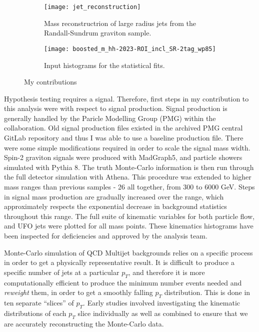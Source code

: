 \documentclass[12pt]{article}
\begin{document}
\begin{figure}[t]
    \centering
    \begin{subfigure}[t]{.48\textwidth}
        \centering
        \texttt{[image: jet\_reconstruction]}
        \caption{Mass reconstructrion of large radius jets from the Randall-Sundrum graviton sample.}
        \label{subfig:jet_reconstruction}
    \end{subfigure}
    \hfill
    \begin{subfigure}[t]{.48\textwidth}
        \centering
        \texttt{[image: boosted\_m\_hh-2023-ROI\_incl\_SR-2tag\_wp85]}
        \caption{Input histograms for the statistical fits.}
        \label{subfig:input_hists}
    \end{subfigure}
\caption{My contributions}
\label{fig:my_contributions}
\end{figure}
Hypothesis testing requires a signal. Therefore, first steps in my contribution
to this analysis were with respect to signal production. Signal production is
generally handled by the Paricle Modelling Group (PMG) within the
collaboration. Old signal production files existed in the archived PMG central
GitLab repository and thus I was able to use a baseline production file. There
were some simple modifications required in order to scale the signal mass width.
Spin-2 graviton signals were produced with MadGraph5, and particle showers
simulated with Pythia 8. The truth Monte-Carlo information is then run through
the full detector simulation with Athena. This procedure was extended to higher
mass ranges than previous samples - 26 all together, from 300 to 6000 GeV. Steps
in signal mass production are gradually increased over the range, which
approximately respects the exponential decrease in background statistics
throughout this range. The full suite of kinematic variables for both particle
flow, and UFO jets were plotted for all mass points. These kinematics histograms
have been inspected for deficiencies and approved by the analysis team.

Monte-Carlo simulation of QCD Multijet backgrounds relies on a specific process
in order to get a physically representative result. It is difficult to produce a
specific number of jets at a particular $p_T$, and therefore it is more
computationally efficient to produce the minimum number events needed and
\textit{reweight} them, in order to get a smoothly falling $p_T$ distribution.
This is done in ten separate ``slices'' of $p_T$. Early studies involved
investigating the kinematic distributions of each $p_T$ slice individually as
well as combined to ensure that we are accurately reconstructing the Monte-Carlo
data.
\end{document}
